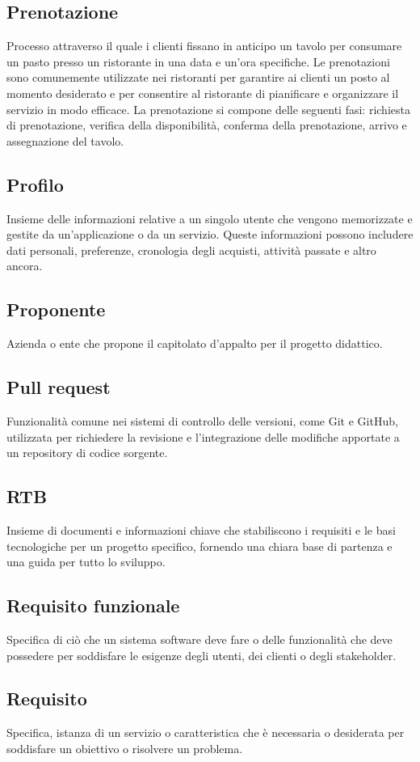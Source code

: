\subsection{Prenotazione}Processo attraverso il quale i clienti fissano in anticipo un tavolo per consumare un pasto presso un ristorante in una data e un'ora specifiche. Le prenotazioni sono comunemente utilizzate nei ristoranti per garantire ai clienti un posto al momento desiderato e per consentire al ristorante di pianificare e organizzare il servizio in modo efficace. La prenotazione si compone delle seguenti fasi: richiesta di prenotazione, verifica della disponibilità, conferma della prenotazione, arrivo e assegnazione del tavolo.
\subsection{Profilo}Insieme delle informazioni relative a un singolo utente che vengono memorizzate e gestite da un'applicazione o da un servizio. Queste informazioni possono includere dati personali, preferenze, cronologia degli acquisti, attività passate e altro ancora.
\subsection{Proponente}Azienda o ente che propone il capitolato d’appalto per il progetto didattico.
\subsection{Pull request}Funzionalità comune nei sistemi di controllo delle versioni, come Git e GitHub, utilizzata per richiedere la revisione e l'integrazione delle modifiche apportate a un repository di codice sorgente.
\subsection{RTB}Insieme di documenti e informazioni chiave che stabiliscono i requisiti e le basi tecnologiche per un progetto specifico, fornendo una chiara base di partenza e una guida per tutto lo sviluppo.
\subsection{Requisito funzionale}Specifica di ciò che un sistema software deve fare o delle funzionalità che deve possedere per soddisfare le esigenze degli utenti, dei clienti o degli stakeholder.
\subsection{Requisito}Specifica, istanza di un servizio o caratteristica che è necessaria o desiderata per soddisfare un obiettivo o risolvere un problema.
